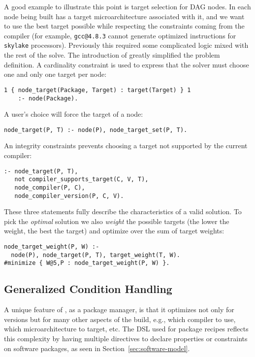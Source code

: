 A good example to illustrate this point is target selection for DAG nodes. In \spack{}
each node being built has a target microarchitecture associated with it, and we want to
use the best target possible while respecting the constraints coming from the compiler
(for example, {\tt gcc@4.8.3} cannot generate optimized instructions for {\tt skylake}
processors). Previously this required some complicated logic mixed with the rest of the
solve. The introduction of \clingo{} greatly simplified the problem definition. A
cardinality constraint is used to express that the solver must choose one and only one
target per node:
%
\begin{verbatim}
1 { node_target(Package, Target) : target(Target) } 1
    :- node(Package).
\end{verbatim}
%
A user's choice will force the target of a node:
%
\begin{verbatim}
node_target(P, T) :- node(P), node_target_set(P, T).
\end{verbatim}
%
An integrity constraints prevents choosing a target not supported by the current compiler:
%
\begin{verbatim}
:- node_target(P, T),
   not compiler_supports_target(C, V, T),
   node_compiler(P, C),
   node_compiler_version(P, C, V).
\end{verbatim}
%
These three statements fully describe the characteristics of a valid solution. To pick
the \emph{optimal} solution we also \emph{weight} the possible targets (the lower the
weight, the best the target) and optimize over the sum of target weights:
%
\begin{verbatim}
node_target_weight(P, W) :-
  node(P), node_target(P, T), target_weight(T, W).
#minimize { W@5,P : node_target_weight(P, W) }.
\end{verbatim}

\subsection{Generalized Condition Handling}
\label{subsec:generalizedcond}
A unique feature of \spack, as a package manager, is that it optimizes not only for
versions but for many other aspects of the build, e.g., which compiler to use,
which microarchitecture to target, etc. The DSL used for package recipes reflects this
complexity by having multiple directives to declare properties or constraints
on software packages, as seen in Section~\ref{sec:software-model}.

